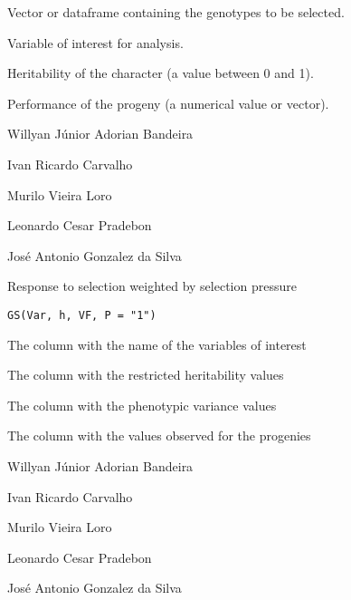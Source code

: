 \documentclass[a4paper]{book}
\begin{document}
%
\begin{Arguments}
\begin{ldescription}
\item[\code{GEN}] Vector or dataframe containing the genotypes to be selected.

\item[\code{VAR}] Variable of interest for analysis.

\item[\code{h2}] Heritability of the character (a value between 0 and 1).

\item[\code{P}] Performance of the progeny (a numerical value or vector).
\end{ldescription}
\end{Arguments}
%
\begin{Author}
Willyan Júnior Adorian Bandeira

Ivan Ricardo Carvalho

Murilo Vieira Loro

Leonardo Cesar Pradebon

José Antonio Gonzalez da Silva
\end{Author}
%
\begin{Description}
Response to selection weighted by selection pressure
\end{Description}
%
\begin{Usage}
\begin{verbatim}
GS(Var, h, VF, P = "1")
\end{verbatim}
\end{Usage}
%
\begin{Arguments}
\begin{ldescription}
\item[\code{Var}] The column with the name of the variables of interest

\item[\code{h}] The column with the restricted heritability values

\item[\code{VF}] The column with the phenotypic variance values

\item[\code{P}] The column with the values observed for the progenies
\end{ldescription}
\end{Arguments}
%
\begin{Author}
Willyan Júnior Adorian Bandeira

Ivan Ricardo Carvalho

Murilo Vieira Loro

Leonardo Cesar Pradebon

José Antonio Gonzalez da Silva
\end{Author}
\end{document}
